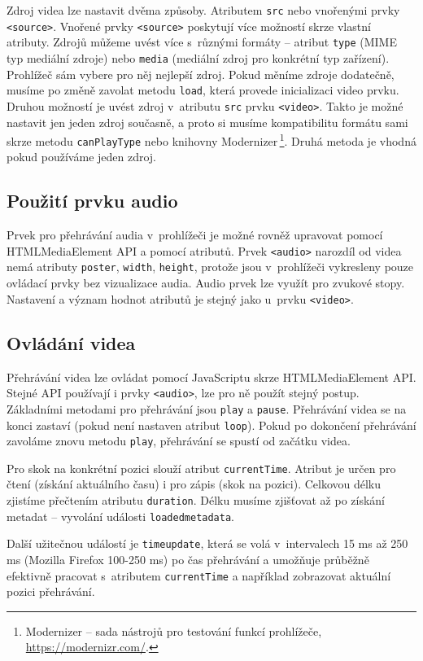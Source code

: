 Zdroj videa lze nastavit dvěma způsoby. Atributem \texttt{src} nebo vnořenými prvky \texttt{<source>}. Vnořené prvky \texttt{<source>} poskytují více možností skrze vlastní atributy. Zdrojů můžeme uvést více s~různými formáty -- atribut \texttt{type} (MIME typ mediální zdroje) nebo \texttt{media} (mediální zdroj pro konkrétní typ zařízení). Prohlížeč sám vybere pro něj nejlepší zdroj. Pokud měníme zdroje dodatečně, musíme po změně zavolat metodu \texttt{load}, která provede inicializaci video prvku. Druhou možností je uvést zdroj v~atributu \texttt{src} prvku \texttt{<video>}. Takto je možné nastavit jen jeden zdroj současně, a proto si musíme kompatibilitu formátu sami skrze metodu \texttt{canPlayType} nebo knihovny Modernizer\,\footnote{Modernizer -- sada nástrojů pro testování funkcí prohlížeče, \url{https://modernizr.com/}.}. Druhá metoda je vhodná pokud používáme jeden zdroj.

\subsection{Použití prvku audio}
Prvek pro přehrávání audia v~prohlížeči je možné rovněž upravovat pomocí HTMLMediaElement API a pomocí atributů. Prvek \texttt{<audio>} narozdíl od videa nemá atributy \texttt{poster}, \texttt{width}, \texttt{height}, protože jsou v~prohlížeči vykresleny pouze ovládací prvky bez vizualizace audia. Audio prvek lze využít pro zvukové stopy. Nastavení a význam hodnot atributů je stejný jako u~prvku \texttt{<video>}.

\subsection{Ovládání videa}
Přehrávání videa lze ovládat pomocí JavaScriptu skrze HTMLMediaElement API. Stejné API používají i prvky \texttt{<audio>}, lze pro ně použít stejný postup. Základními metodami pro přehrávání jsou \texttt{play} a \texttt{pause}. Přehrávání videa se na konci zastaví (pokud není nastaven atribut \texttt{loop}). Pokud po dokončení přehrávání zavoláme znovu metodu \texttt{play}, přehrávání se spustí od začátku videa.

Pro skok na konkrétní pozici slouží atribut \texttt{currentTime}. Atribut je určen pro čtení (získání aktuálního času) i pro zápis (skok na pozici). Celkovou délku zjistíme přečtením atributu \texttt{duration}. Délku musíme zjišťovat až po získání metadat -- vyvolání události \texttt{loadedmetadata}.

Další užitečnou událostí je \texttt{timeupdate}, která se volá v~intervalech 15 ms až 250 ms (Mozilla Firefox 100-250 ms) po čas přehrávání a umožňuje průběžně efektivně pracovat s~atributem \texttt{currentTime} a například zobrazovat aktuální pozici přehrávání.

